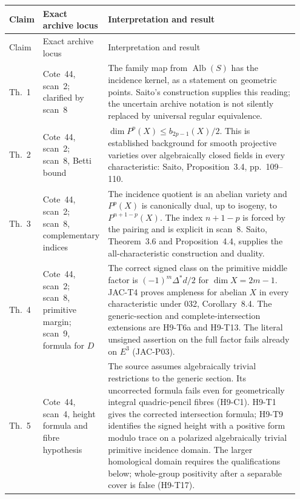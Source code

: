 \documentclass[11pt,a4paper]{article}
\begin{document}
\begingroup
\small
\setlength{\tabcolsep}{4pt}
\renewcommand{\arraystretch}{1.15}
\begin{longtable}{@{}p{0.08\linewidth}p{0.19\linewidth}p{0.68\linewidth}@{}}
\toprule
Claim & Exact archive locus & Interpretation and result\\
\midrule
\endfirsthead
\toprule
Claim & Exact archive locus & Interpretation and result\\
\midrule
\endhead
Th.~1 & Cote~44, scan~2; clarified by scan~8 &
The family map from $\operatorname{Alb}(S)$ has the incidence
kernel, as a statement on geometric points. Saito's construction
supplies this reading; the uncertain archive notation is not
silently replaced by universal regular equivalence.\\

Th.~2 & Cote~44, scan~2; scan~8, Betti bound &
$\dim P^p(X)\le b_{2p-1}(X)/2$. This is established background for
smooth projective varieties over algebraically closed fields in
every characteristic: Saito, Proposition~3.4, pp.~109--110.\\

Th.~3 & Cote~44, scan~2; scan~8, complementary indices &
The incidence quotient is an abelian variety and $P^p(X)$ is
canonically dual, up to isogeny, to $P^{n+1-p}(X)$.
The index $n+1-p$ is forced by the pairing and is explicit in
scan~8. Saito, Theorem~3.6 and Proposition~4.4, supplies the
all-characteristic construction and duality.\\

Th.~4 & Cote~44, scan~2; scan~8, primitive margin; scan~9, formula for $D$ &
The correct signed class on the primitive middle factor is
$(-1)^m\Delta^*d/2$ for $\dim X=2m-1$.
JAC-T4 proves ampleness for abelian $X$ in every characteristic
under 032, Corollary~8.4. The generic-section and complete-intersection
extensions are H9-T6a and H9-T13. The literal unsigned assertion
on the full factor fails already on $E^3$ (JAC-P03).\\

Th.~5 & Cote~44, scan~4, height formula and fibre hypothesis &
The source assumes algebraically trivial restrictions to the generic
section. Its uncorrected formula fails even for geometrically
integral quadric-pencil fibres (H9-C1). H9-T1 gives the corrected
intersection formula; H9-T9 identifies the signed height with a
positive form modulo trace on a polarized algebraically trivial
primitive incidence domain. The larger homological domain requires
the qualifications below; whole-group positivity after a separable
cover is false (H9-T17).\\


\end{longtable}
\end{document}
